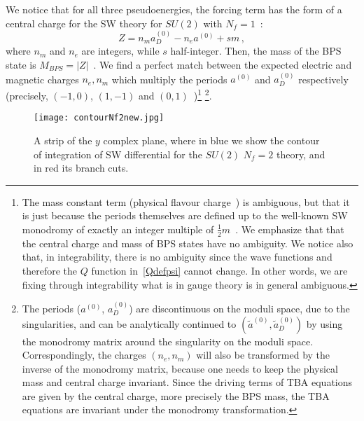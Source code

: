 \documentclass[11pt,a4paper]{elsarticle}
\newcommand{\Blue}[1]{\textcolor{blue}{#1}}
\newcommand{\comH}[1]{{\bf \Blue{H: #1}}}
\newcommand{\be}{\begin{equation}}
\newcommand{\ee}{\end{equation}}
\numberwithin{figure}{section}
\numberwithin{table}{section}
\begin{document}
We notice that for all three pseudoenergies, the forcing term has the form of a central charge for the SW theory for $SU(2)$ with $N_f=1$~\cite{SeibergWitten:1994QCD}: 
\be \label{ZNf1}
Z =  n_m a_D^{(0)}-n_e a^{(0)} + s m\,,
\ee 
where $n_m$ and $ n_e$ are integers, while $s$ half-integer. Then, the mass of the BPS state is $M_{BPS}=|Z|$~\cite{BilalFerrari-massive:1997}. %
We find a perfect match between the expected electric and magnetic charges $n_e,n_m$ which multiply the periods $a^{(0)}$ and $a_D^{(0)}$ respectively (precisely, $(-1,0)$, $(1,-1)$ and $(0,1)$~\cite{BilalFerrariQCD:1996})\footnote{The mass constant term (physical flavour charge~\cite{Ferrari:1996de}) is ambiguous, but that it is just because the periods themselves are defined up to the well-known SW monodromy of exactly an integer multiple of $\frac{1}{2}m$~\cite{SeibergWitten:1994QCD,AlvarezGaumeMarinoZamora:1997,BilalFerrari-massive:1997}. We emphasize that that the central charge and mass of BPS states have no ambiguity.  We notice also that, in integrability, there is no ambiguity since the wave functions and therefore the $Q$ function in~\eqref{Qdefpsi} cannot change. In other words, we are fixing through integrability what is in gauge theory is in general ambiguous.} \footnote{The periods ($a^{(0)}$, $a_D^{(0)}$) are discontinuous on the moduli space, due to the singularities,
and can be analytically continued to $(\tilde{a}^{(0)}, \tilde{a}_D^{(0)})$ by using the monodromy matrix around the singularity on the moduli space. Correspondingly, the charges $(n_e, n_m)$ will also be transformed by the inverse of the monodromy matrix, because one needs to keep the physical mass and central charge invariant. Since the driving terms of TBA equations are given by the central charge, more precisely the BPS mass, the TBA equations are invariant under the monodromy transformation.}. 




\begin{figure}[t]
\centering
\texttt{[image: contourNf2new.jpg]}%
\caption{A strip of the $y$ complex plane, where in blue we show the contour of integration of SW differential for the $SU(2)$ $N_f=2$ theory, and in red its branch cuts.}%
\label{figY2cycSW}
\end{figure}
\end{document}
